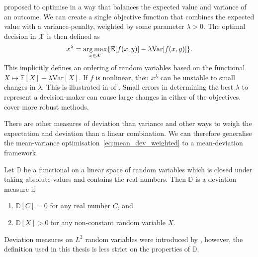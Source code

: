 \documentclass[main.tex]{subfiles}
\begin{document}
\begin{example}
  \citet{markowitz1952portfolio} proposed to optimise in a way that
  balances the expected value and variance of an outcome.
  We can create a single objective function that combines
  the expected value with a variance-penalty, weighted by some
  parameter $\lambda>0$. The optimal decision in $\mathcal{X}$ is then
  defined as
  \begin{equation}\label{eq:mean_dev_weighted}
    x^{\lambda}=\operatorname*{arg\,max}_{x\in\mathcal{X}}\{\mathbb{E}[f(x,y)]-\lambda
    \mbox{Var}[f(x,y)]\}.
  \end{equation}
  This implicitly defines an ordering of random variables based on
  the functional $X\mapsto \mathbb{E}[X]-\lambda \mbox{Var}[X]$.
  If $f$ is nonlinear, then $x^{\lambda}$ can be unstable to
  small changes in $\lambda$. This is illustrated in
   of .
  Small errors in determining the best
  $\lambda$ to represent a decision-maker can cause large changes in
  either of the objectives. \citet{marler2004survey} cover
  more robust methods.
\end{example}

There are other measures of deviation than variance and other ways to
weigh the expectation and deviation than a linear combination. We can
therefore generalise the mean-variance
optimisation~\eqref{eq:mean_dev_weighted} to a mean-deviation framework.

\begin{mydef}
  Let $\mathbb{D}$ be a functional on a linear space of random
  variables which is closed under taking absolute values and contains
  the real numbers.
  Then $\mathbb{D}$ is a deviation measure if
  \begin{enumerate}
  \item $\mathbb{D}[C] = 0$ for any real number $C$, and
  \item $\mathbb{D}[X]>0$ for any non-constant random variable $X$.
  \end{enumerate}
\end{mydef}
Deviation measures on $L^2$ random variables were introduced by
\citet{rockafellar2006generalized}, however, the definition used in this thesis
is less strict on the properties of $\mathbb{D}$.
\end{document}
